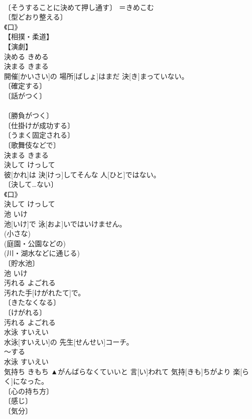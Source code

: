 \documentclass[8pt]{extreport}
\begin{document}
\begin{CJK}{UTF8}{min}
\\	〔そうすることに決めて押し通す〕 ＝きめこむ 
\\	〔型どおり整える〕 
\\	《口》 
\\	【相撲・柔道】 
\\	【演劇】 
\\	決める	きめる	
\\	決まる	きまる	
\\	開催[かいさい]の 場所[ばしょ]はまだ 決[き]まっていない。	
\\	〔確定する〕 
\\	〔話がつく〕 
\\	[⇒きまっている, きまった, きまって, さだまる] 
\\	〔勝負がつく〕 
\\	〔仕掛けが成功する〕 
\\	〔うまく固定される〕 
\\	〔歌舞伎などで〕 
\\	決まる	きまる	
\\	決して	けっして	
\\	彼[かれ]は 決[けっ]してそんな 人[ひと]ではない。	
\\	〔決して…ない〕 
\\	《口》 
\\	決して	けっして	
\\	池	いけ	
\\	池[いけ]で 泳[およ]いではいけません。	
\\	(小さな) 
\\	(庭園・公園などの) 
\\	(川・湖水などに通じる) 
\\	〔貯水池〕 
\\	池	いけ	
\\	汚れる	よごれる	
\\	汚れた手[けがれたて]で。	
\\	〔きたなくなる〕 
\\	〔けがれる〕 
\\	汚れる	よごれる	
\\	水泳	すいえい	
\\	水泳[すいえい]の 先生[せんせい]{コーチ}。	
\\	～する 
\\	水泳	すいえい	
\\	気持ち	きもち	▲がんばらなくていいと 言[い]われて 気持[きも]ちがより 楽[らく]になった。	
\\	〔心の持ち方〕 
\\	〔感じ〕 
\\	〔気分〕 

\end{CJK}
\end{document}

